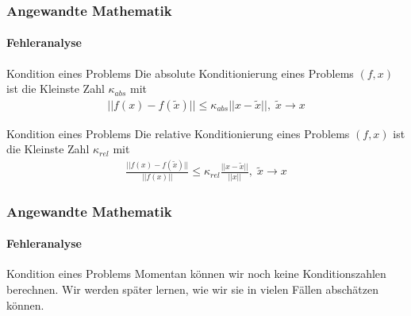 \documentclass{beamer}
\begin{document}
\begin{frame}
    \frametitle{Angewandte Mathematik}
\framesubtitle{Fehleranalyse}
    \begin{block}{Kondition eines Problems}
Die absolute Konditionierung eines Problems $(f,x)$ ist die Kleinste Zahl $\kappa_{abs}$ mit 
\begin{align*}
|| f(x) - f(\widetilde{x}) || \leq \kappa_{abs} || x - \widetilde{x} || , \;  \widetilde{x} \to x
\end{align*}
\end{block}

    \begin{block}{Kondition eines Problems}
Die relative  Konditionierung eines Problems $(f,x)$ ist die Kleinste Zahl $\kappa_{rel}$ mit 
\begin{align*}
\frac{|| f(x) - f(\widetilde{x}) ||}{||f(x) || } \leq \kappa_{rel} \frac{|| x - \widetilde{x} ||}{||x||} , \; \widetilde{x} \to x
\end{align*}
\end{block}

 \end{frame}


\begin{frame}
    \frametitle{Angewandte Mathematik}
\framesubtitle{Fehleranalyse}
    \begin{block}{Kondition eines Problems}
Momentan können wir noch keine Konditionszahlen berechnen. Wir werden später lernen, wie wir sie in vielen Fällen abschätzen können.
\end{block}
 \end{frame}
\end{document}
